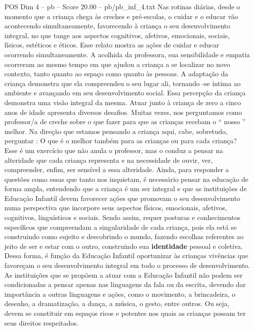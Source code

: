 \begin{textsample}{POS Dim 4 – pb – Score 20.00 – pb/pb\_inf\_4.txt}
Nas rotinas diárias, desde o momento que a criança chega às creches e pré-escolas, o cuidar e o educar vão acontecendo simultaneamente, favorecendo à criança o seu desenvolvimento integral, no que tange aos aspectos cognitivos, afetivos, emocionais, sociais, físicos, estéticos e éticos.
Esse relato mostra as ações de cuidar e educar ocorrendo simultaneamente.
A acolhida da professora, sua sensibilidade e empatia ocorreram ao mesmo tempo em que ajudou a criança a se localizar no novo contexto, tanto quanto ao espaço como quanto às pessoas.
A adaptação da criança demonstra que ela compreendeu o seu lugar ali, tornando -se íntima ao ambiente e avançando em seu desenvolvimento social.
Essa percepção da criança demonstra uma visão integral da mesma.
Atuar junto à criança de zero a cinco anos de idade apresenta diversos desafios.
Muitas vezes, nos perguntamos como professor/a de creche sobre o que fazer para que as crianças recebam o “ nosso ” melhor.
Na direção que estamos pensando a criança aqui, cabe, sobretudo, perguntar : O que é o melhor também para as crianças ou para cada criança?
Esse é um exercício que não anula o professor, mas o conduz a pensar na alteridade que cada criança representa e na necessidade de ouvir, ver, compreender, enfim, ser sensível a essa alteridade.
Ainda, para responder a questões como essas que tanto nos inquietam, é necessário pensar na educação de forma ampla, entendendo que a criança é um ser integral e que as instituições de Educação Infantil devem favorecer ações que promovam o seu desenvolvimento numa perspectiva que incorpore seus aspectos físicos, emocionais, afetivos, cognitivos, linguísticos e sociais.
Sendo assim, requer posturas e conhecimentos específicos que compreendam a singularidade de cada criança, pois ela está se construindo como sujeito e descobrindo o mundo, fazendo escolhas referentes ao jeito de ser e estar com o outro, construindo sua \textbf{identidade} pessoal e coletiva.
Dessa forma, é função da Educação Infantil oportunizar às crianças vivências que favoreçam o seu desenvolvimento integral em todo o processo de desenvolvimento.
As instituições que se propõem a atuar com a Educação Infantil não podem ser condicionadas a pensar apenas nas linguagens da fala ou da escrita, devendo dar importância a outras linguagens e ações, como o movimento, a brincadeira, o desenho, a dramatização, a dança, a música, o gesto, entre outros.
Ou seja, devem se constituir em espaços ricos e potentes nos quais as crianças possam ter seus direitos respeitados.

\end{textsample}
